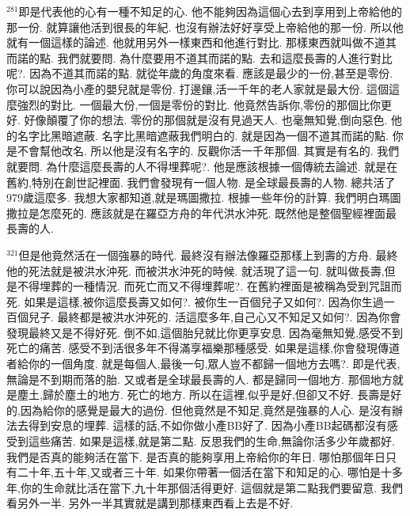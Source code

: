 \documentclass{book}
\begin{document}
$^{281}$即是代表他的心有一種不知足的心.
他不能夠因為這個心去到享用到上帝給他的那一份.
就算讓他活到很長的年紀.
也沒有辦法好好享受上帝給他的那一份.
所以他就有一個這樣的論述.
他就用另外一樣東西和他進行對比.
那樣東西就叫做不道其而諾的點.
我們就要問.
為什麼要用不道其而諾的點.
去和這麼長壽的人進行對比呢?.
因為不道其而諾的點.
就從年歲的角度來看.
應該是最少的一份,甚至是零份.
你可以說因為小產的嬰兒就是零份.
打邊鑲,活一千年的老人家就是最大份.
這個這麼強烈的對比.
一個最大份,一個是零份的對比.
他竟然告訴你,零份的那個比你更好.
好像顛覆了你的想法.
零份的那個就是沒有見過天人.
也毫無知覺,倒向惡色.
他的名字比黑暗遮蔽.
名字比黑暗遮蔽我們明白的.
就是因為一個不道其而諾的點.
你是不會幫他改名.
所以他是沒有名字的.
反觀你活一千年那個.
其實是有名的.
我們就要問.
為什麼這麼長壽的人不得埋葬呢?.
他是應該根據一個傳統去論述.
就是在舊約,特別在創世記裡面.
我們會發現有一個人物.
是全球最長壽的人物.
總共活了979歲這麼多.
我想大家都知道,就是瑪圖撒拉.
根據一些年份的計算.
我們明白瑪圖撒拉是怎麼死的.
應該就是在羅亞方舟的年代洪水沖死.
既然他是整個聖經裡面最長壽的人.

$^{321}$但是他竟然活在一個強暴的時代.
最終沒有辦法像羅亞那樣上到壽的方舟.
最終他的死法就是被洪水沖死.
而被洪水沖死的時候.
就活現了這一句.
就叫做長壽,但是不得埋葬的一種情況.
而死亡而又不得埋葬呢?.
在舊約裡面是被稱為受到咒詛而死.
如果是這樣,被你這麼長壽又如何?.
被你生一百個兒子又如何?.
因為你生過一百個兒子.
最終都是被洪水沖死的.
活這麼多年,自己心又不知足又如何?.
因為你會發現最終又是不得好死.
倒不如,這個胎兒就比你更享安息.
因為毫無知覺,感受不到死亡的痛苦.
感受不到活很多年不得滿享福樂那種感受.
如果是這樣,你會發現傳道者給你的一個角度.
就是每個人,最後一句,眾人豈不都歸一個地方去嗎?.
即是代表,無論是不到期而落的胎.
又或者是全球最長壽的人.
都是歸同一個地方.
那個地方就是塵土,歸於塵土的地方.
死亡的地方.
所以在這裡,似乎是好,但卻又不好.
長壽是好的,因為給你的感覺是最大的過份.
但他竟然是不知足,竟然是強暴的人心.
是沒有辦法去得到安息的埋葬.
這樣的話,不如你做小產BB好了.
因為小產BB起碼都沒有感受到這些痛苦.
如果是這樣,就是第二點.
反思我們的生命,無論你活多少年歲都好.
我們是否真的能夠活在當下.
是否真的能夠享用上帝給你的年日.
哪怕那個年日只有二十年,五十年,又或者三十年.
如果你帶著一個活在當下和知足的心.
哪怕是十多年,你的生命就比活在當下,九十年那個活得更好.
這個就是第二點我們要留意.
我們看另外一半.
另外一半其實就是講到那樣東西看上去是不好.
\end{document}
